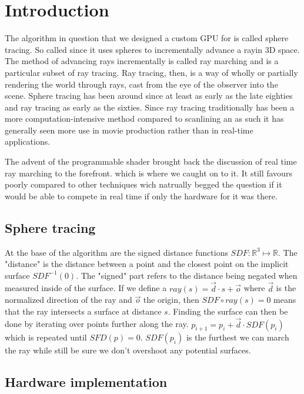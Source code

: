 \chapter{Introduction} 

The algorithm in question that we designed a custom GPU for is called sphere
tracing.\cite{Hart1996} So called since it uses spheres to incrementally
advance a ray\footnotemark in 3D space. The method of advancing rays
incrementally is called ray marching and is a particular subset of ray
tracing.\cite{Whitted1980} Ray tracing, then, is a way of wholly or partially
rendering the world through rays, cast from the eye of the observer into the
scene.  Sphere tracing has been around since at least as early as the late
eighties and ray tracing as early as the sixties.\cite{Hart1989,Appel1968}
Since ray tracing traditionally has been a more computation-intensive method
compared to scanlining\cite{Wylie1967} an as such it has generally seen more
use in movie production rather than in real-time applications.\cite{ref_needed?} 


The advent of the programmable shader brought back the discussion of real time
ray marching to the forefront. which is where we caught on to it.
\cite{JamieWong2016} It still favours poorly compared to other techniques wich
natrually begged the question if it would be able to compete in real time if
only the hardware for it was there.


\section{Sphere tracing}

At the base of the algorithm are the signed distance functions
$SDF:\mathbb{R}^{3}\mapsto\mathbb{R}$. The "distance" is the distance between a
point and the closest point on the implicit surface $SDF^{-1}(0)$. The "signed"
part refers to the distance being negated when measured inside of the surface.
If we define a $ray(s) = \vec{d} \cdot s + \vec{o}$ where $\vec{d}$ is the
normalized direction of the ray and $\vec{o}$ the origin, then $SDF\circ ray(s)
  = 0$ means that the ray intersects a surface at distance $s$. Finding the
  surface can then be done by iterating over points further along the ray.
  $p_{i+1} = p_i + \vec{d}\cdot SDF(p_i)$ which is repeated until $SFD(p) = 0$.
  $SDF(p_i)$ is the furthest we can march the ray while still be sure we don't
  overshoot any potential surfaces. 

\section{Hardware implementation}
